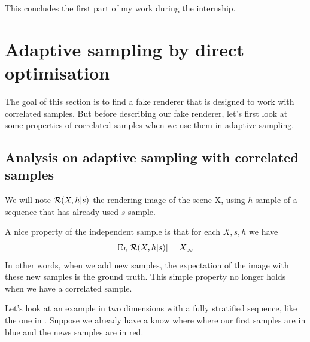 \documentclass{classeENS}
\begin{document}
\par This concludes the first part of my work during the internship.

\section{Adaptive sampling by direct optimisation}

The goal of this section is to find a fake renderer that is designed to work
with correlated samples. But before describing our fake renderer, let's first look at
some properties of correlated samples when we use them in adaptive sampling.

\subsection{Analysis on adaptive sampling with correlated samples}

We will note $\mathcal R(X, h | s)$ the rendering image of the scene X, using $h$ sample of
a sequence that has already used $s$ sample.

\par A nice property of the independent sample is that for each $X,s,h$ we have
\[ \mathbb E_h[\mathcal R(X,h | s)] = X_\infty \]
In other words, when we add new samples, the expectation of the image 
with these new samples is the ground truth. This simple property no 
longer holds when we have a correlated sample.
\par Let's look at an example in two dimensions with a fully stratified 
sequence, like the one in \cite{10.2312:sr.20211287}. Suppose we already 
have a know where where our first samples are in blue and the news samples 
are in red.
\end{document}
